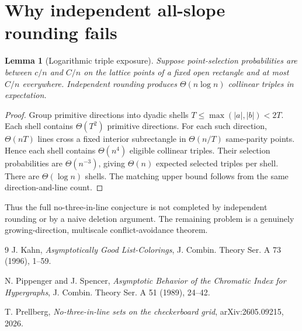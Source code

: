 \documentclass[11pt]{article}
\newtheorem{lemma}[theorem]{Lemma}
\begin{document}
\section{Why independent all-slope rounding fails}
\begin{lemma}[Logarithmic triple exposure]
Suppose point-selection probabilities are between $c/n$ and $C/n$ on the lattice points of a fixed open rectangle and at most $C/n$ everywhere. Independent rounding produces $\Theta(n\log n)$ collinear triples in expectation.
\end{lemma}
\begin{proof}
Group primitive directions into dyadic shells $T\le\max(|a|,|b|)<2T$. Each shell contains $\Theta(T^2)$ primitive directions. For each such direction, $\Theta(nT)$ lines cross a fixed interior subrectangle in $\Theta(n/T)$ same-parity points. Hence each shell contains $\Theta(n^4)$ eligible collinear triples. Their selection probabilities are $\Theta(n^{-3})$, giving $\Theta(n)$ expected selected triples per shell. There are $\Theta(\log n)$ shells. The matching upper bound follows from the same direction-and-line count.\qedhere
\end{proof}

Thus the full no-three-in-line conjecture is not completed by independent rounding or by a naive deletion argument. The remaining problem is a genuinely growing-direction, multiscale conflict-avoidance theorem.

\begin{thebibliography}{9}
J. Kahn,
\emph{Asymptotically Good List-Colorings},
J. Combin. Theory Ser. A 73 (1996), 1--59.

N. Pippenger and J. Spencer,
\emph{Asymptotic Behavior of the Chromatic Index for Hypergraphs},
J. Combin. Theory Ser. A 51 (1989), 24--42.

T. Prellberg,
\emph{No-three-in-line sets on the checkerboard grid},
arXiv:2605.09215, 2026.
\end{thebibliography}
\end{document}
